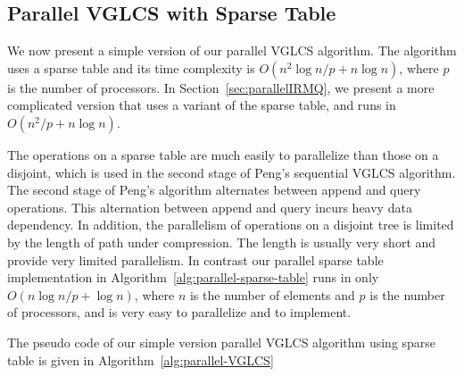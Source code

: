\subsection{Parallel VGLCS with Sparse Table}

We now present a simple version of our parallel VGLCS algorithm.  The
algorithm uses a sparse table and its time complexity is $O(n^2 \log n
/ p + n \log n)$, where $p$ is the number of processors.  In
Section~\ref{sec:parallelIRMQ}, we present a more complicated version
that uses a variant of the sparse table, and runs in $O(n^2 / p + n
\log n)$.

The operations on a sparse table are much easily to parallelize than
those on a disjoint, which is used in the second stage of Peng's
sequential VGLCS algorithm.  The second stage of Peng's algorithm
alternates between append and query operations.  This alternation
between append and query incurs heavy data dependency.  In addition,
the parallelism of operations on a disjoint tree is limited by the
length of path under compression.  The length is usually very short
and provide very limited parallelism.  In contrast our parallel sparse
table implementation in Algorithm~\ref{alg:parallel-sparse-table} runs
in only $O(n \log n / p + \log n)$, where $n$ is the number of
elements and $p$ is the number of processors, and is very easy to
parallelize and to implement.



The pseudo code of our simple version parallel VGLCS algorithm using
sparse table is given in Algorithm~\ref{alg:parallel-VGLCS}


